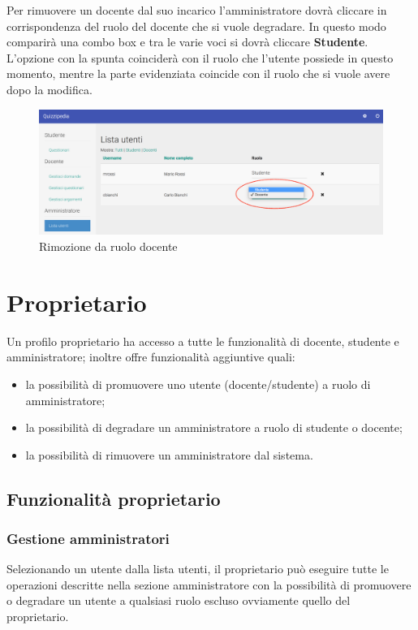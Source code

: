 \documentclass[12pt,a4paper]{article}
\begin{document}
	Per rimuovere un docente dal suo incarico l'amministratore dovrà cliccare in corrispondenza del ruolo del docente che si vuole degradare. In questo modo comparirà una combo box e tra le varie voci si dovrà cliccare \textbf{Studente}.
	L'opzione con la spunta coinciderà con il ruolo che l'utente possiede in questo momento, mentre la parte evidenziata coincide con il ruolo che si vuole avere dopo la modifica.
	
		\begin{figure}[H]
			\centering
			\includegraphics[width=1\linewidth]{../img/screenshot/cambioRuoloDocStud.png}
			\caption{Rimozione da ruolo docente}
			\label{Rimozione da ruolo docente}
		\end{figure}
	
	\section{Proprietario} 
	\par Un profilo proprietario ha accesso a tutte le funzionalità di docente, studente e amministratore; inoltre offre funzionalità aggiuntive quali: \\
	\begin{itemize}
		\item la possibilità di promuovere uno utente (docente/studente) a ruolo di amministratore;
		\item la possibilità di degradare un amministratore a ruolo di studente o docente;
		\item la possibilità di rimuovere un amministratore dal sistema.
	\end{itemize}
	\subsection{Funzionalità proprietario}
	
	\subsubsection{Gestione  amministratori}
	\par Selezionando un utente dalla lista utenti, il proprietario può eseguire tutte le operazioni descritte nella sezione amministratore con la possibilità di promuovere o degradare un utente a qualsiasi ruolo escluso ovviamente quello del proprietario. \\
	
\end{document}
